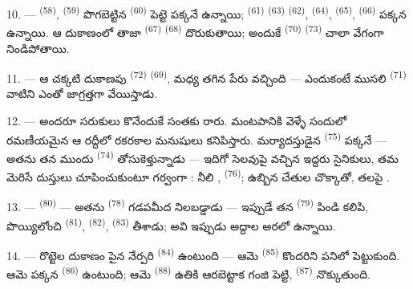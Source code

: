 \VUsaut{4.0mm}
\VUsaut{3.0mm}

10. ---  \textsuperscript{(58)},  \textsuperscript{(59)}
పొగబెట్టిన  \textsuperscript{(60)} పెట్టె పక్కనే ఉన్నాయి;
 \textsuperscript{(61)}  \textsuperscript{(63)}
 \textsuperscript{(62)},  \textsuperscript{(64)},
 \textsuperscript{(65)},  \textsuperscript{(66)}
పక్కన ఉన్నాయి. ఆ దుకాణంలో తాజా  \textsuperscript{(67)}
 \textsuperscript{(68)} దొరుకుతాయి; అందుకే 
\textsuperscript{(70)}  \textsuperscript{(73)} చాలా వేగంగా
నిండిపోతాయి.

11. --- ఆ చక్కటి దుకాణపు  \textsuperscript{(72)}
 \textsuperscript{(69)},  మధ్య తగిన పేరు వచ్చింది —
ఎందుకంటే ముసలి  \textsuperscript{(71)} వాటిని ఎంతో జాగ్రత్తగా
వేయిస్తాడు.

\VUsaut{4.0mm}
\VUsaut{3.0mm}

12. --- అందరూ సరుకులు కొనేందుకే సంతకు రారు. మంటపానికి వెళ్ళే సందులో రమణీయమైన ఆ రద్దీలో
రకరకాల మనుషులు కనిపిస్తారు. మర్యాదస్తుడైన 
\textsuperscript{(75)} పక్కనే — అతను తన ముందు  \textsuperscript{(74)}
తోసుకెళ్తున్నాడు — ఇదిగో సెలవుపై వచ్చిన ఇద్దరు సైనికులు, తమ మెరిసే దుస్తులు
చూపించుకుంటూ గర్వంగా : నీలి , 
 \textsuperscript{(76)}; ఉబ్బిన చేతుల చొక్కాతో, తలపై
 .

13. ---  \textsuperscript{(80)} — అతను 
\textsuperscript{(78)} గడపమీద నిలబడ్డాడు — ఇప్పుడే తన  \textsuperscript{(79)}
పిండి కలిపి, పొయ్యిలోంచి  \textsuperscript{(81)},
 \textsuperscript{(82)}, 
\textsuperscript{(83)} తీశాడు; అవి ఇప్పుడు అద్దాల అరలో ఉన్నాయి.

14. --- రొట్టెల దుకాణం పైన నేర్పరి  \textsuperscript{(84)}
ఉంటుంది — ఆమె  \textsuperscript{(85)} కొందరిని పనిలో
పెట్టుకుంది. ఆమె పక్కన  \textsuperscript{(86)}
ఉంటుంది; ఆమె  \textsuperscript{(88)} ఉతికి ఆరబెట్టాక గంజి పెట్టి,
 \textsuperscript{(87)} నొక్కుతుంది.

